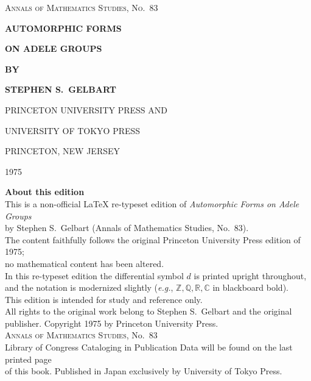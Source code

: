 \documentclass[11pt,a4paper,openright,twoside]{book}
\theoremstyle{plain}
\theoremstyle{definition}
\theoremstyle{remark}
\newcommand{\Z}{\mathbb{Z}}
\newcommand{\Q}{\mathbb{Q}}
\newcommand{\R}{\mathbb{R}}
\newcommand{\C}{\mathbb{C}}
\begin{document}
\frontmatter

\begin{titlepage}
    \begin{center}
        \vspace*{1cm}
        {\large\scshape Annals of Mathematics Studies, No.~83\par}
        \vspace{2.5cm}
        {\Huge\bfseries AUTOMORPHIC FORMS\par}
        {\Huge\bfseries ON ADELE GROUPS\par}
        \vspace{2.5cm}
        {\Large\bfseries BY\par}
        \vspace{0.8cm}
        {\Large\bfseries STEPHEN S.\ GELBART\par}
        \vfill
        {\large PRINCETON UNIVERSITY PRESS AND\par}
        {\large UNIVERSITY OF TOKYO PRESS\par}
        \vspace{0.5cm}
        {\large PRINCETON, NEW JERSEY\par}
        {\large 1975\par}
    \end{center}
\end{titlepage}

\thispagestyle{empty}
\begin{center}
    \small
    \noindent\textbf{About this edition}\\[0.5em]
    This is a non-official \LaTeX{} re-typeset edition of \emph{Automorphic Forms on Adele Groups}\\
    by Stephen S.\ Gelbart (Annals of Mathematics Studies, No.~83).\\
    The content faithfully follows the original Princeton University Press edition of 1975;\\
    no mathematical content has been altered.\\[0.5em]
    In this re-typeset edition the differential symbol $d$ is printed upright throughout,\\
    and the notation is modernized slightly (\emph{e.g.}, $\Z,\Q,\R,\C$ in blackboard bold).\\[0.8em]
    This edition is intended for study and reference only.\\
    All rights to the original work belong to Stephen S.\ Gelbart and the original publisher.
    \vfill
    \noindent Copyright \textcopyright{} 1975 by Princeton University Press.\\
    \textsc{Annals of Mathematics Studies}, No.~83\\
    Library of Congress Cataloging in Publication Data will be found on the last printed page\\
    of this book. Published in Japan exclusively by University of Tokyo Press.
\end{center}
\end{document}
